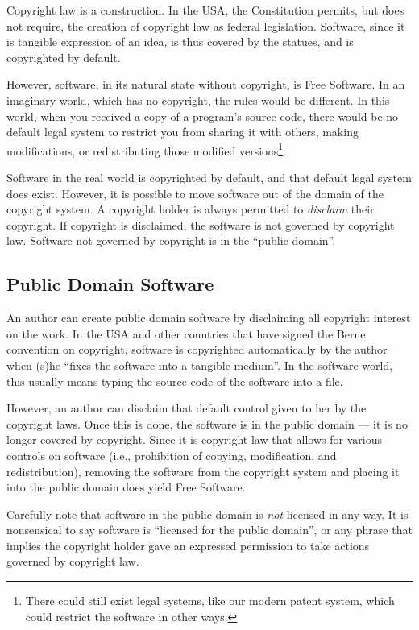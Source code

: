 \documentclass[12pt]{report}
\newcommand{\defn}[1]{\emph{#1}}
\begin{document}
Copyright law is a construction.  In the USA, the Constitution permits,
but does not require, the creation of copyright law as federal
legislation.  Software, since it is tangible expression of an idea, is
thus covered by the statues, and is copyrighted by default.

However, software, in its natural state without copyright, is Free
Software.  In an imaginary world, which has no copyright, the rules would
be different.  In this world, when you received a copy of a program's
source code, there would be no default legal system to restrict you from
sharing it with others, making modifications, or redistributing those
modified versions\footnote{There could still exist legal systems, like our
  modern patent system, which could restrict the software in other ways.}.

Software in the real world is copyrighted by default, and that default
legal system does exist.  However, it is possible to move software out of
the domain of the copyright system.  A copyright holder is always
permitted to \defn{disclaim} their copyright.  If copyright is disclaimed,
the software is not governed by copyright law.  Software not governed by
copyright is in the ``public domain''.

\subsection{Public Domain Software}

An author can create public domain software by disclaiming all copyright
interest on the work.  In the USA and other countries that have signed the
Berne convention on copyright, software is copyrighted automatically by
the author when (s)he ``fixes the software into a tangible medium''.  In
the software world, this usually means typing the source code of the
software into a file.

However, an author can disclaim that default control given to her by the
copyright laws.  Once this is done, the software is in the public domain
--- it is no longer covered by copyright.  Since it is copyright law that
allows for various controls on software (i.e., prohibition of copying,
modification, and redistribution), removing the software from the
copyright system and placing it into the public domain does yield Free
Software.

Carefully note that software in the public domain is \emph{not} licensed
in any way.  It is nonsensical to say software is ``licensed for the
public domain'', or any phrase that implies the copyright holder gave an
expressed permission to take actions governed by copyright law.
\end{document}
